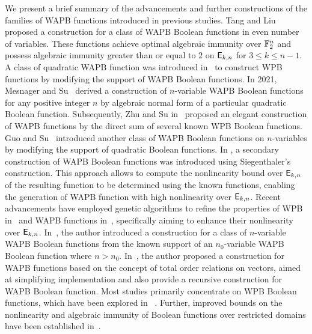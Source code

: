 \documentclass{llncs}
\begin{document}
We present a brief summary of the advancements and further constructions of the families of WAPB functions introduced in previous studies. 
Tang and Liu~\cite{CC:TangLiu19} proposed a construction for a class of WAPB Boolean functions in even number of variables. 
These functions achieve optimal algebraic immunity over $\mathbb{F}_2^n$ and possess algebraic immunity greater than or equal to $2$ on $\mathsf{E}_{k,n}$ for $3 \leq k \leq n-1$.
A class of quadratic WAPB function was introduced in~\cite{DAM:LiSu20} to construct WPB functions by modifying the support of WAPB Boolean functions. 
In 2021, Mesnager and Su~\cite{CC:MesSu21} derived a construction of $n$-variable WAPB Boolean functions for any positive integer $n$ by algebraic normal form of a particular quadratic Boolean function. 
Subsequently, Zhu and Su in~\cite{DAM:ZhuSu22} proposed an elegant construction of WAPB functions by the direct sum of several known WPB Boolean functions. 
Guo and Su~\cite{DAM:GuoSu22} introduced another class of WAPB Boolean functions on $n$-variables by modifying the support of quadratic Boolean functions. 
In \cite{INDO:GinMea22}, a secondary construction of WAPB Boolean functions was introduced using Siegenthaler's construction. 
This approach allows to compute the nonlinearity bound over $\mathsf{E}_{k,n}$ of the resulting function to be determined using the known functions, enabling the generation of WAPB function with high nonlinearity over $\mathsf{E}_{k,n}$. 
Recent advancements have employed genetic algorithms to refine the properties of WPB in~\cite{CEC:MPJDL22,ACI:ManKuLar22} and WAPB functions in~\cite{ASIACCS:YCL+23}, specifically aiming to enhance their nonlinearity over $\mathsf{E}_{k,n}$. In~\cite{AMC:DM24}, the author introduced a construction for a class of $n$-variable WAPB Boolean functions from the known support of an $n_0$-variable WAPB Boolean function where $n > n_0$. 
In~\cite{SAC:Meaux24}, the author proposed a construction for WAPB functions based on the concept of total order relations on vectors, aimed at simplifying implementation and also provide a recursive construction for WAPB Boolean function.
Most studies primarily concentrate on WPB Boolean functions, which have been explored in  ~\cite{DCC:LiuMes19,CC:MesSu21,DAM:Su21,CEC:MPJDL22,C2SI:GinMea23,Latin:GinMea23,DAM:ZLCQZ23,BFA:DM23,AMC:ZhangSu23,Mat:ZJZQ23,CCDS:GinMea24}. 
Further, improved bounds on the nonlinearity and algebraic immunity of Boolean functions over restricted domains have been established in~\cite{IC:MMMRS18,CC:MSLZ22,DAM:GinMea22,C2SI:GinMea23,Latin:GinMea23}. 
\end{document}
